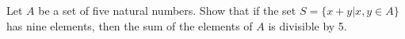 Let $A$ be a set of  five natural numbers. Show that if the set $ S = \{x + y | x, y\in A \}$ has nine elements, then the sum of the elements of $A$ is divisible by 5.

